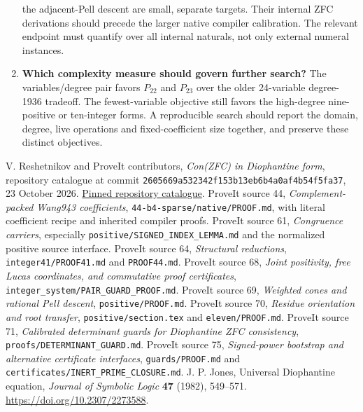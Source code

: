 \documentclass[11pt]{article}
\theoremstyle{remark}\newtheorem{remark}[theorem]{Remark}
\begin{document}
\begin{enumerate}
the adjacent-Pell descent are small, separate targets. Their internal
ZFC derivations should precede the larger native compiler calibration.
The relevant endpoint must quantify over all internal naturals, not only
external numeral instances.
\item \textbf{Which complexity measure should govern further search?}
The variables/degree pair favors $P_{22}$ and $P_{23}$ over the older
24-variable degree-1936 tradeoff. The fewest-variable objective still favors the
high-degree nine-positive or ten-integer forms. A reproducible search
should report the domain, degree, live operations and fixed-coefficient
size together, and preserve these distinct objectives.
\end{enumerate}

\begin{thebibliography}{99}
 V. Reshetnikov and ProveIt contributors,
\emph{Con(ZFC) in Diophantine form}, repository catalogue at commit
\texttt{2605669a532342f153b13eb6b4a0af4b54f5fa37}, 23 October 2026.
\href{https://github.com/VladimirReshetnikov/ProveIt/tree/2605669a532342f153b13eb6b4a0af4b54f5fa37/Computability/DiophantineConsistency/con-zfc-diophantine-forms}{Pinned repository catalogue}.
 ProveIt source 44, \emph{Complement-packed Wang943
coefficients}, \texttt{44-b4-sparse/native/PROOF.md}, with literal
coefficient recipe and inherited compiler proofs.
 ProveIt source 61, \emph{Congruence carriers}, especially
\texttt{positive/SIGNED\_INDEX\_LEMMA.md} and the normalized positive
source interface.
 ProveIt source 64, \emph{Structural reductions},
\texttt{integer41/PROOF41.md} and \texttt{PROOF44.md}.
 ProveIt source 68, \emph{Joint positivity, free Lucas
coordinates, and commutative proof certificates},
\texttt{integer\_system/PAIR\_GUARD\_PROOF.md}.
 ProveIt source 69, \emph{Weighted cones and rational Pell
descent}, \texttt{positive/PROOF.md}.
 ProveIt source 70, \emph{Residue orientation and root
transfer}, \texttt{positive/section.tex} and \texttt{eleven/PROOF.md}.
 ProveIt source 71, \emph{Calibrated determinant guards for
Diophantine ZFC consistency}, \texttt{proofs/DETERMINANT\_GUARD.md}.
 ProveIt source 75, \emph{Signed-power bootstrap and
alternative certificate interfaces}, \texttt{guards/PROOF.md} and
\texttt{certificates/INERT\_PRIME\_CLOSURE.md}.
 J. P. Jones, Universal Diophantine equation,
\emph{Journal of Symbolic Logic} \textbf{47} (1982), 549--571.
\url{https://doi.org/10.2307/2273588}.
\end{thebibliography}
\end{document}
